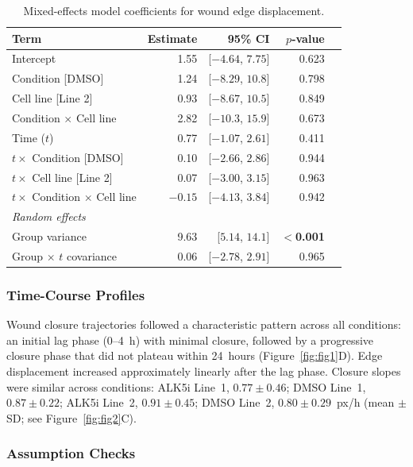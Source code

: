 \begin{table}[t]
  \centering
  \caption{Mixed-effects model coefficients for wound edge displacement.}\label{tab:mixed}
  \begin{tabular}{lrrrr}
    \toprule
    Term & Estimate & 95\% CI & $p$-value \\
    \midrule
    Intercept & 1.55 & [$-4.64$, $7.75$] & 0.623 \\
    Condition [DMSO] & 1.24 & [$-8.29$, $10.8$] & 0.798 \\
    Cell line [Line 2] & 0.93 & [$-8.67$, $10.5$] & 0.849 \\
    Condition $\times$ Cell line & 2.82 & [$-10.3$, $15.9$] & 0.673 \\
    Time ($t$) & 0.77 & [$-1.07$, $2.61$] & 0.411 \\
    $t \times$ Condition [DMSO] & 0.10 & [$-2.66$, $2.86$] & 0.944 \\
    $t \times$ Cell line [Line 2] & 0.07 & [$-3.00$, $3.15$] & 0.963 \\
    $t \times$ Condition $\times$ Cell line & $-0.15$ & [$-4.13$, $3.84$] & 0.942 \\
    \midrule
    \multicolumn{4}{l}{\textit{Random effects}} \\
    Group variance & 9.63 & [$5.14$, $14.1$] & $<$\textbf{0.001} \\
    Group $\times$ $t$ covariance & 0.06 & [$-2.78$, $2.91$] & 0.965 \\
    \bottomrule
  \end{tabular}
\end{table}

\subsubsection{Time-Course Profiles}

Wound closure trajectories followed a characteristic pattern across all conditions: an initial lag phase (0--4~h) with minimal closure, followed by a progressive closure phase that did not plateau within 24~hours (Figure~\ref{fig:fig1}D). Edge displacement increased approximately linearly after the lag phase. Closure slopes were similar across conditions: ALK5i Line~1, $0.77 \pm 0.46$; DMSO Line~1, $0.87 \pm 0.22$; ALK5i Line~2, $0.91 \pm 0.45$; DMSO Line~2, $0.80 \pm 0.29$~px/h (mean $\pm$ SD; see Figure~\ref{fig:fig2}C).

\subsubsection{Assumption Checks}

